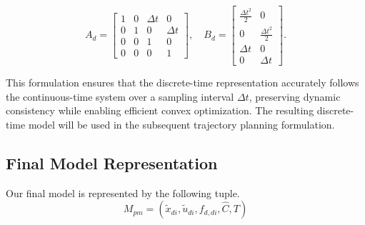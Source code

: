 \begin{equation}
	A_d = \begin{bmatrix}
		1 & 0 & \Delta t & 0        \\
		0 & 1 & 0        & \Delta t \\
		0 & 0 & 1        & 0        \\
		0 & 0 & 0        & 1
	\end{bmatrix},
	\quad
	B_d = \begin{bmatrix}
		\frac{\Delta t^2}{2} & 0                    \\
		0                    & \frac{\Delta t^2}{2} \\
		\Delta t             & 0                    \\
		0                    & \Delta t
	\end{bmatrix}.
\end{equation}

This formulation ensures that the discrete-time representation accurately follows the continuous-time system over a sampling interval \( \Delta t \),
preserving dynamic consistency while enabling efficient convex optimization.
The resulting discrete-time model will be used in the subsequent trajectory planning formulation.

\subsection{Final Model Representation} \label{subsec:pm_resulting_model}

Our final model is represented by the following tuple.
\begin{equation}
	M_{pm} = (\tilde{x}_{di}, \tilde{u}_{di}, f_{d, di}, \hat{C}, T)
	\label{model:point_mass}
\end{equation}
